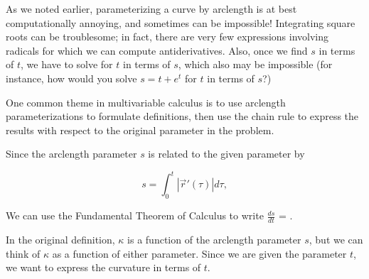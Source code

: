 \documentclass{ximera}
\begin{document}
\begin{exercise}
\begin{exercise}
\begin{exercise}
\begin{exercise}
%
%
%
%
%
%
%
%
%
%
   
As we noted earlier, parameterizing a curve by arclength is at best computationally annoying, and sometimes can be impossible!  Integrating square roots can be troublesome; in fact, there are very few expressions involving radicals for which we can compute antiderivatives.  Also, once we find $s$ in terms of $t$, we have to solve for $t$ in terms of $s$, which also may be impossible (for instance, how would you solve $s= t +e^t$ for $t$ in terms of $s$?)

One common theme in multivariable calculus is to use arclength parameterizations to formulate definitions, then use the chain rule to express the results with respect to the original parameter in the problem. 

Since the arclength parameter $s$ is related to the given parameter by 

\[
s = \int^t_0 \left| \vec{r}  '(\tau) \right|  d \tau,\]

We can use the Fundamental Theorem of Calculus to write $\frac{ds}{dt}$ = .

In the original definition, $\kappa$ is a function of the arclength parameter $s$, but we can think of $\kappa$ as a function of either parameter.  Since we are given the parameter $t$, we want to express the curvature in terms of $t$. 


\end{exercise}
\end{exercise}
\end{exercise}
\end{exercise}
\end{document}
